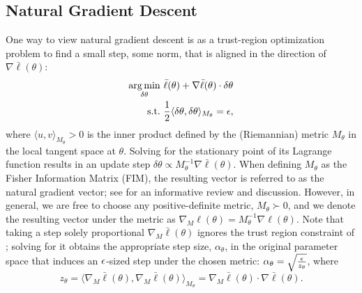 \subsection{Natural Gradient Descent}
\label{sec:cgrad}
One way to view natural gradient descent \cite{amari1998} is as
a trust-region optimization problem to find a small step, \wrt some norm,
that is aligned in the direction of $\nabla\bar\ell(\theta)$:
%
\begin{align}
\operatorname*{arg\,min}_{\delta \theta} & ~ \bar{\ell}(\theta) + \nabla \bar{\ell}(\theta) \cdot \delta\theta \nonumber\\
\text{s.t.} & ~ \frac{1}{2} \langle \delta\theta, \delta\theta\rangle_{M_{\theta}}  = {\epsilon}, \label{eq:trust}
\end{align}
%
where $\langle u, v\rangle_{M_{\theta}} > 0$ is the inner product
defined by the (Riemannian) metric $M_{\theta}$ in the local tangent space at $\theta$.
%
Solving for the stationary point of its Lagrange function results in an update step
$\delta \theta \propto M_{\theta}^{-1} \nabla \bar{\ell}(\theta)$.
When defining $M_\theta$ as the Fisher Information Matrix (FIM), the resulting
vector is referred to as the natural gradient vector; see \citet{kunster2019} for an informative review and discussion.
However, in general, we are free to choose any positive-definite metric, $M_{\theta} \succ 0$,
and we denote the resulting vector under the metric as $\nabla_{M} \ell(\theta) = M_{\theta}^{-1} \nabla \ell(\theta)$.
%
%
Note that taking a step solely proportional $\nabla_{M}\bar{\ell}(\theta)$
ignores the trust region constraint of ;
solving for it obtains the appropriate step size, $\alpha_{\theta}$,
in the original parameter space that induces an  ${\epsilon}$-sized step under the chosen metric:
$\alpha_{\theta} = \sqrt{\frac{{\epsilon}}{z_\theta}}$, where
%
\begin{equation}
\label{eq:metricnorm}
z_\theta
= \langle \nabla_{M} \bar{\ell}(\theta), \nabla_{M} \bar{\ell}(\theta) \rangle_{M_{\theta}}
= \nabla_{M} \bar{\ell}(\theta) \cdot \nabla \bar{\ell}(\theta).
\end{equation}
%
%
%
%
%

%
%
%
%
%

